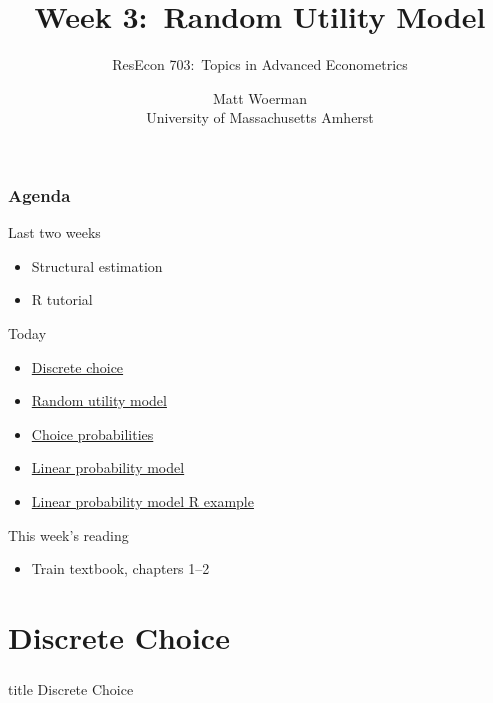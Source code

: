 \documentclass{beamer}
\title[Week 3:\ Random Utility Model]{Week 3:\ Random Utility Model}
\author[ResEcon 703:\ Advanced Econometrics]{ResEcon 703:\ Topics in Advanced Econometrics}
\date{Matt Woerman\\University of Massachusetts Amherst}
\begin{document}
{ 
\begin{frame}[noframenumbering]
    \titlepage
\end{frame}
}

\begin{frame}\frametitle{Agenda}
    Last two weeks
    \begin{itemize}
        \item Structural estimation
        \item R tutorial
    \end{itemize}
    \vspace{2ex}
    Today
    \begin{itemize}
        \item \hyperlink{page.\getpagerefnumber{dc}}{Discrete choice}
        \item \hyperlink{page.\getpagerefnumber{rum}}{Random utility model}
        \item \hyperlink{page.\getpagerefnumber{probabilities}}{Choice probabilities}
        \item \hyperlink{page.\getpagerefnumber{lpm}}{Linear probability model}
        \item \hyperlink{page.\getpagerefnumber{example}}{Linear probability model R example}
    \end{itemize}
    \vspace{2ex}
    This week's reading
    \begin{itemize}
        \item Train textbook, chapters 1--2
    \end{itemize}
\end{frame}

\section{Discrete Choice}
\label{dc}
\begin{frame}\frametitle{}
    \vfill
    \centering
    \begin{beamercolorbox}[center]{title}
        \Large Discrete Choice
    \end{beamercolorbox}
    \vfill
\end{frame}
\end{document}
